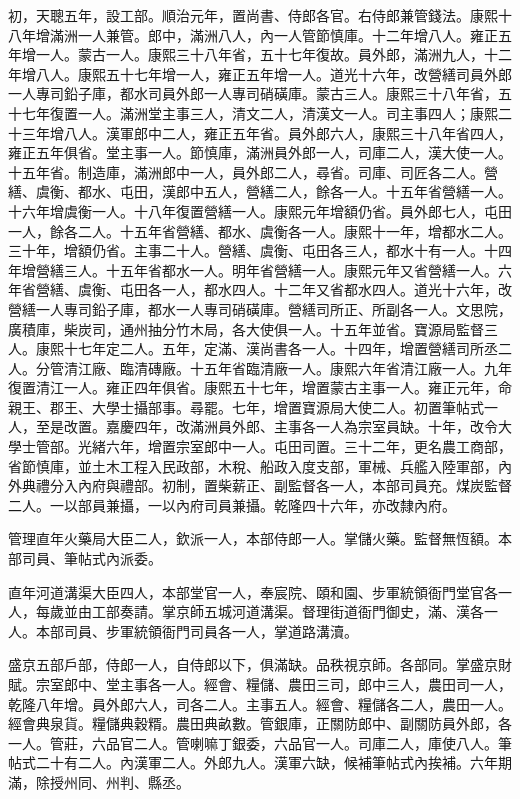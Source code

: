\begin{pinyinscope}
初，天聰五年，設工部。順治元年，置尚書、侍郎各官。右侍郎兼管錢法。康熙十八年增滿洲一人兼管。郎中，滿洲八人，內一人管節慎庫。十二年增八人。雍正五年增一人。蒙古一人。康熙三十八年省，五十七年復故。員外郎，滿洲九人，十二年增八人。康熙五十七年增一人，雍正五年增一人。道光十六年，改營繕司員外郎一人專司鉛子庫，都水司員外郎一人專司硝磺庫。蒙古三人。康熙三十八年省，五十七年復置一人。滿洲堂主事三人，清文二人，清漢文一人。司主事四人；康熙二十三年增八人。漢軍郎中二人，雍正五年省。員外郎六人，康熙三十八年省四人，雍正五年俱省。堂主事一人。節慎庫，滿洲員外郎一人，司庫二人，漢大使一人。十五年省。制造庫，滿洲郎中一人，員外郎二人，尋省。司庫、司匠各二人。營繕、虞衡、都水、屯田，漢郎中五人，營繕二人，餘各一人。十五年省營繕一人。十六年增虞衡一人。十八年復置營繕一人。康熙元年增額仍省。員外郎七人，屯田一人，餘各二人。十五年省營繕、都水、虞衡各一人。康熙十一年，增都水二人。三十年，增額仍省。主事二十人。營繕、虞衡、屯田各三人，都水十有一人。十四年增營繕三人。十五年省都水一人。明年省營繕一人。康熙元年又省營繕一人。六年省營繕、虞衡、屯田各一人，都水四人。十二年又省都水四人。道光十六年，改營繕一人專司鉛子庫，都水一人專司硝磺庫。營繕司所正、所副各一人。文思院，廣積庫，柴炭司，通州抽分竹木局，各大使俱一人。十五年並省。寶源局監督三人。康熙十七年定二人。五年，定滿、漢尚書各一人。十四年，增置營繕司所丞二人。分管清江廠、臨清磚廠。十五年省臨清廠一人。康熙六年省清江廠一人。九年復置清江一人。雍正四年俱省。康熙五十七年，增置蒙古主事一人。雍正元年，命親王、郡王、大學士攝部事。尋罷。七年，增置寶源局大使二人。初置筆帖式一人，至是改置。嘉慶四年，改滿洲員外郎、主事各一人為宗室員缺。十年，改令大學士管部。光緒六年，增置宗室郎中一人。屯田司置。三十二年，更名農工商部，省節慎庫，並土木工程入民政部，木稅、船政入度支部，軍械、兵艦入陸軍部，內外典禮分入內府與禮部。初制，置柴薪正、副監督各一人，本部司員充。煤炭監督二人。一以部員兼攝，一以內府司員兼攝。乾隆四十六年，亦改隸內府。

管理直年火藥局大臣二人，欽派一人，本部侍郎一人。掌儲火藥。監督無恆額。本部司員、筆帖式內派委。

直年河道溝渠大臣四人，本部堂官一人，奉宸院、頤和園、步軍統領衙門堂官各一人，每歲並由工部奏請。掌京師五城河道溝渠。督理街道衙門御史，滿、漢各一人。本部司員、步軍統領衙門司員各一人，掌道路溝瀆。

盛京五部戶部，侍郎一人，自侍郎以下，俱滿缺。品秩視京師。各部同。掌盛京財賦。宗室郎中、堂主事各一人。經會、糧儲、農田三司，郎中三人，農田司一人，乾隆八年增。員外郎六人，司各二人。主事五人。經會、糧儲各二人，農田一人。經會典泉貨。糧儲典穀糈。農田典畝數。管銀庫，正關防郎中、副關防員外郎，各一人。管莊，六品官二人。管喇嘛丁銀委，六品官一人。司庫二人，庫使八人。筆帖式二十有二人。內漢軍二人。外郎九人。漢軍六缺，候補筆帖式內挨補。六年期滿，除授州同、州判、縣丞。


\end{pinyinscope}
